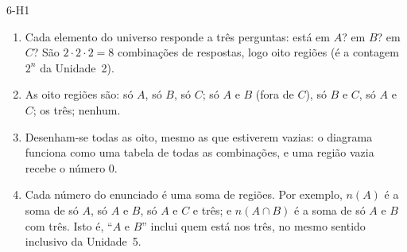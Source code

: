 \begin{construcao}{6-H1}
\begin{enumerate}[label=(\arabic*)]
  \item Cada elemento do universo responde a três perguntas: está em $A$? em $B$? em $C$? São $2\cdot2\cdot2=8$ combinações de respostas, logo oito regiões (é a contagem $2^n$ da Unidade~2).
  \item As oito regiões são: só $A$, só $B$, só $C$; só $A$ e $B$ (fora de $C$), só $B$ e $C$, só $A$ e $C$; os três; nenhum.
\begin{center}
\end{center}
  \item Desenham-se todas as oito, mesmo as que estiverem vazias: o diagrama funciona como uma tabela de todas as combinações, e uma região vazia recebe o número 0.
  \item Cada número do enunciado é uma soma de regiões. Por exemplo, $n(A)$ é a soma de só $A$, só $A$ e $B$, só $A$ e $C$ e três; e $n(A\cap B)$ é a soma de só $A$ e $B$ com três. Isto é, \enquote{$A$ e $B$} inclui quem está nos três, no mesmo sentido inclusivo da Unidade~5.
\end{enumerate}
\end{construcao}

